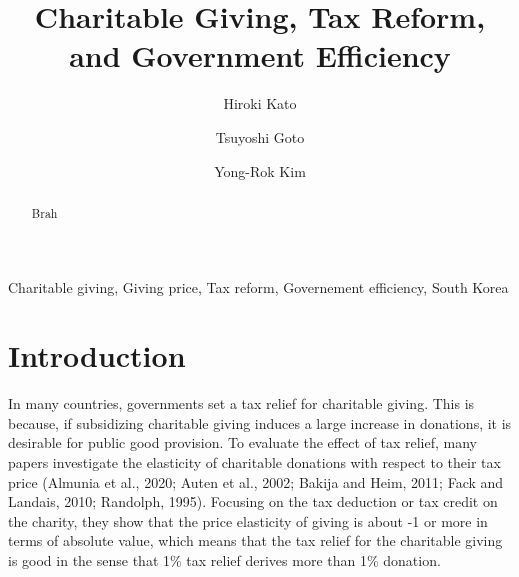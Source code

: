 \documentclass[ review  , 3p ]{elsarticle}
\begin{document}
  \begin{frontmatter}

    \title{Charitable Giving, Tax Reform, and Government Efficiency}
                \author[Osaka University]{
      Hiroki Kato 
       \corref{*} }
        \author[Chiba University]{
      Tsuyoshi Goto 
      }
        \author[Kobe University]{
      Yong-Rok Kim 
      }
            \address[Osaka University]{Graduate School of Economics, Osaka University, Japan}
        \address[Chiba University]{Graduate School of Economics, Chiba University, Japan}
        \address[Kobe University]{Graduate School of Economics, Kobe University, Japan}
      
        \begin{abstract}
      Brah
    \end{abstract}
      
        \begin{keyword}
      Charitable giving, Giving price, Tax reform, Governement efficiency, South Korea
    \end{keyword}
    
  \end{frontmatter}

  \hypertarget{introduction}{%
  \section{Introduction}\label{introduction}}

  In many countries, governments set a tax relief for charitable giving. This is because, if subsidizing charitable giving induces a large increase in donations, it is desirable for public good provision. To evaluate the effect of tax relief, many papers investigate the elasticity of charitable donations with respect to their tax price (Almunia et al., 2020; Auten et al., 2002; Bakija and Heim, 2011; Fack and Landais, 2010; Randolph, 1995). Focusing on the tax deduction or tax credit on the charity, they show that the price elasticity of giving is about -1 or more in terms of absolute value, which means that the tax relief for the charitable giving is good in the sense that 1\% tax relief derives more than 1\% donation.
\end{document}
